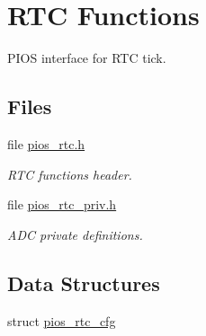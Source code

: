 \hypertarget{group___p_i_o_s___r_t_c}{\section{R\-T\-C Functions}
\label{group___p_i_o_s___r_t_c}
}


P\-I\-O\-S interface for R\-T\-C tick.  


\subsection*{Files}
\begin{DoxyCompactItemize}
\item 
file \hyperlink{pios__rtc_8h}{pios\-\_\-rtc.\-h}
\begin{DoxyCompactList}\small\item\em R\-T\-C functions header. \end{DoxyCompactList}\item 
file \hyperlink{pios__rtc__priv_8h}{pios\-\_\-rtc\-\_\-priv.\-h}
\begin{DoxyCompactList}\small\item\em A\-D\-C private definitions. \end{DoxyCompactList}\end{DoxyCompactItemize}
\subsection*{Data Structures}
\begin{DoxyCompactItemize}
\item 
struct \hyperlink{structpios__rtc__cfg}{pios\-\_\-rtc\-\_\-cfg}
\end{DoxyCompactItemize}

